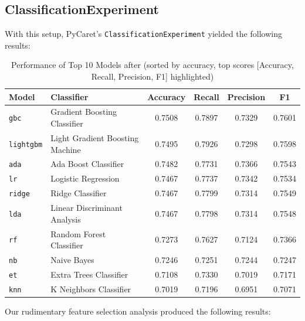 \documentclass[a4paper,12pt]{article}
\begin{document}
\subsection{ClassificationExperiment}
With this setup, PyCaret's \texttt{ClassificationExperiment} yielded the following results:

\begin{table}[H]
\centering
\begin{tabular}{l l c c c c}
\toprule
\textbf{Model} & \textbf{Classifier} & \textbf{Accuracy} & \textbf{Recall} & \textbf{Precision} & \textbf{F1} \\
\midrule
\texttt{gbc} & Gradient Boosting Classifier & \cellcolor{yellow}0.7508 & 0.7897 & 0.7329 & \cellcolor{yellow}0.7601 \\
\texttt{lightgbm} & Light Gradient Boosting Machine & 0.7495 & \cellcolor{yellow}0.7926 & 0.7298 & 0.7598 \\
\texttt{ada} & Ada Boost Classifier & 0.7482 & 0.7731 & \cellcolor{yellow}0.7366 & 0.7543 \\
\texttt{lr} & Logistic Regression & 0.7467 & 0.7737 & 0.7342 & 0.7534 \\
\texttt{ridge} & Ridge Classifier & 0.7467 & 0.7799 & 0.7314 & 0.7549 \\
\texttt{lda} & Linear Discriminant Analysis & 0.7467 & 0.7798 & 0.7314 & 0.7548 \\
\texttt{rf} & Random Forest Classifier & 0.7273 & 0.7627 & 0.7124 & 0.7366 \\
\texttt{nb} & Naive Bayes & 0.7246 & 0.7251 & 0.7244 & 0.7247 \\
\texttt{et} & Extra Trees Classifier & 0.7108 & 0.7330 & 0.7019 & 0.7171 \\
\texttt{knn} & K Neighbors Classifier & 0.7019 & 0.7196 & 0.6951 & 0.7071 \\
\bottomrule
\end{tabular}
\caption{Performance of Top 10 Models after (sorted by accuracy, top scores [Accuracy, Recall, Precision, F1] highlighted)}
\label{tab:model_performance}
\end{table}

Our rudimentary feature selection analysis produced the following results:
\end{document}
